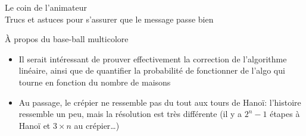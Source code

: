 \begin{frame}{Le coin de l'animateur\\[-5pt]
  {\large Trucs et astuces pour s'assurer que le message passe bien}}
\begin{block}{À propos du base-ball multicolore}
\begin{itemize}
      (cf. \url{http://www.loria.fr/~quinson/Teaching/TOP/}).
    \item Il serait intéressant de prouver effectivement la correction de
      l'algorithme linéaire, ainsi que de quantifier la probabilité de
      fonctionner de l'algo qui tourne en fonction du nombre de maisons
    \item Au passage, le crépier ne ressemble pas du tout aux tours de Hanoï:
      l'histoire ressemble un peu, mais la résolution est très différente (il y
      a $2^n-1$ étapes à Hanoï et $3\times n$ au crépier\ldots)
    \end{itemize}
  \end{block}
\end{frame}


